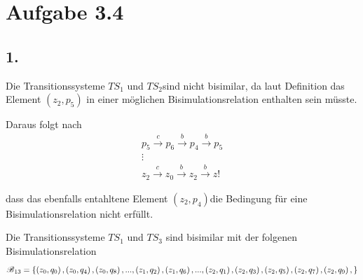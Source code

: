 \documentclass[12pt, paper=a4]{article}
\begin{document}
\section*{Aufgabe 3.4}

\subsection*{1.}

	Die Transitionssysteme $TS_{1}$ und $TS_{2}$sind nicht bisimilar,
	da laut Definition das Element $\left(z_{2},p_{5}\right)$ in einer
	möglichen Bisimulationsrelation enthalten sein müsste. 

	Daraus folgt nach 
	\begin{gather*}
		p_{5}\stackrel{c}{\rightarrow}p_{6}\stackrel{b}{\rightarrow}p_{4}\stackrel{b}{\rightarrow}p_{5}\\
		\vdots\\
		z_{2}\stackrel{c}{\rightarrow}z_{0}\stackrel{b}{\rightarrow}z_{2}\stackrel{b}{\rightarrow}z!
	\end{gather*}


	dass das ebenfalls entahltene Element $\left(z_{2},p_{4}\right)$die
	Bedingung für eine Bisimulationsrelation nicht erfüllt.

	Die Transitionssysteme $TS_{1}$ und $TS_{3}$ sind bisimilar mit
	der folgenen Bisimulationsrelation 
	\[
		\text{\ensuremath{\mathscr{B}}}_{13}=\left\{ \left(z_{0},q_{0}\right),\left(z_{0},q_{4}\right),\left(z_{0},q_{8}		\right),...,\left(z_{1},q_{2}\right),\left(z_{1},q_{6}\right),...,\left(z_{2},q_{1}\right),\left(z_{2},q_{3}			\right),\left(z_{2},q_{5}\right),\left(z_{2},q_{7}\right),\left(z_{2},q_{9}\right),\right\} 
	\]
\end{document}
